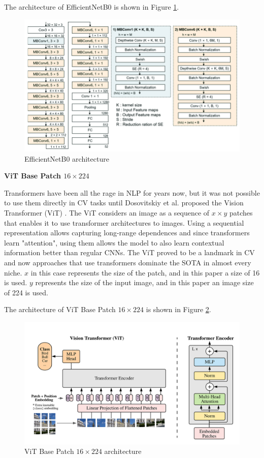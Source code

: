 \documentclass[a4paper,11pt,openright]{book}
\begin{document}
The architecture of EfficientNetB0 is shown in Figure \ref{fig:efficientnetb0}.
\begin{figure}[!htb]
    \centering
    \includegraphics[width=.6\linewidth]{images/effnetarch.png}
    \caption{EfficientNetB0 architecture}
    \label{fig:efficientnetb0}
\end{figure}


\textbf{ViT Base Patch $16 \times 224$}

Transformers have been all the rage in NLP for years now, but it was not possible to use them directly in CV tasks until Dosovitskiy et al. proposed the Vision Transformer (ViT) \cite{dosovitskiyImageWorth16x162021}. The ViT considers an image as a sequence of $x \times y$ patches that enables it to use transformer architectures to images. Using a sequential representation allows capturing long-range dependences and since transformers learn "attention", using them allows the model to also learn contextual information better than regular CNNs. The ViT proved to be a landmark in CV and now approaches that use transformers dominate the SOTA in almost every niche. $x$ in this case represents the size of the patch, and in this paper a size of 16 is used. $y$ represents the size of the input image, and in this paper an image size of 224 is used. 

The architecture of ViT Base Patch $16 \times 224$ is shown in Figure \ref{fig:vit}.
\begin{figure}[!htb]
    \centering
    \includegraphics[width=.6\linewidth]{images/vitarch.png}
    \caption{ViT Base Patch $16 \times 224$ architecture}
    \label{fig:vit}
\end{figure}
\end{document}
